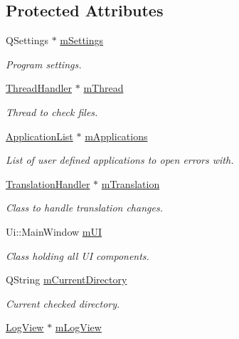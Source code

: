 \subsection*{Protected Attributes}
\begin{DoxyCompactItemize}
\item 
Q\-Settings $\ast$ \hyperlink{class_main_window_ac842753fda612bfd6f9b60b07f71acc2}{m\-Settings}
\begin{DoxyCompactList}\small\item\em Program settings. \end{DoxyCompactList}\item 
\hyperlink{class_thread_handler}{Thread\-Handler} $\ast$ \hyperlink{class_main_window_a139aa6f8e80e8cef62a0eb72aa1c4071}{m\-Thread}
\begin{DoxyCompactList}\small\item\em Thread to check files. \end{DoxyCompactList}\item 
\hyperlink{class_application_list}{Application\-List} $\ast$ \hyperlink{class_main_window_a917ee334c1141d4f04bd1b242904a85e}{m\-Applications}
\begin{DoxyCompactList}\small\item\em List of user defined applications to open errors with. \end{DoxyCompactList}\item 
\hyperlink{class_translation_handler}{Translation\-Handler} $\ast$ \hyperlink{class_main_window_aba23fb4a828abca9434df9ce0e2419a7}{m\-Translation}
\begin{DoxyCompactList}\small\item\em Class to handle translation changes. \end{DoxyCompactList}\item 
Ui\-::\-Main\-Window \hyperlink{class_main_window_a03f313abfd5dc1ae549448b80093d480}{m\-U\-I}
\begin{DoxyCompactList}\small\item\em Class holding all U\-I components. \end{DoxyCompactList}\item 
Q\-String \hyperlink{class_main_window_ac43e5a474fe32ed819b1b7e2ca49e311}{m\-Current\-Directory}
\begin{DoxyCompactList}\small\item\em Current checked directory. \end{DoxyCompactList}\item 
\hyperlink{class_log_view}{Log\-View} $\ast$ \hyperlink{class_main_window_ad374532b6d59f49e92083d75a6d8c12c}{m\-Log\-View}

\end{DoxyCompactItemize}
